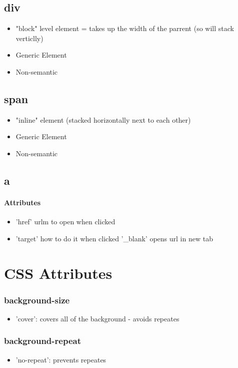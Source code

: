 \documentclass[]{article}
\newcommand{\<}{\guilsinglleft}
\renewcommand{\>}{\guilsinglright}
\begin{document}
\subsection{div}
\begin{itemize}
	\item "block" level element = takes up the width of the parrent (so will stack verticlly)
	\item Generic Element
	\item Non-semantic
\end{itemize}

\subsection{span}
\begin{itemize}
	\item "inline" element (stacked horizontally next to each other)
	\item Generic Element
	\item Non-semantic
\end{itemize}

\subsection{a}
\paragraph{Attributes}
\begin{itemize}
	\item 'href' urlm to open when clicked
	\item 'target' how to do it when clicked
	\subitem '\_blank' opens url in new tab 
\end{itemize}


\section{CSS Attributes}
\subsubsection{background-size}
\begin{itemize}
	\item 'cover': covers all of the background - avoids repeates
\end{itemize}
\subsubsection{background-repeat}
\begin{itemize}
	\item 'no-repeat': prevents repeates
\end{itemize}
\end{document}

